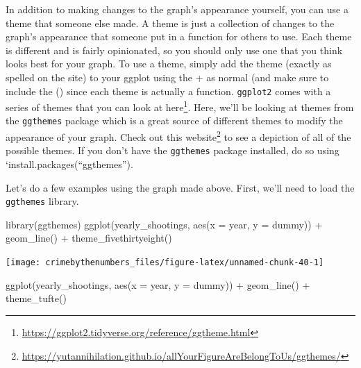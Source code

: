 \documentclass[
]{krantz}
\makeatletter
\newenvironment{Shaded}{\begin{snugshade}}{\end{snugshade}}
\newcommand{\AttributeTok}[1]{\textcolor[rgb]{0.61,0.61,0.61}{#1}}
\newcommand{\FunctionTok}[1]{\textcolor[rgb]{0,0,0}{#1}}
\newcommand{\NormalTok}[1]{#1}
\newcommand{\SpecialCharTok}[1]{\textcolor[rgb]{0,0,0}{#1}}
\renewcommand{\href}[2]{#2\footnote{\url{#1}}}
\newenvironment{kframe}{%
\medskip{}
\setlength{\fboxsep}{.8em}
 \def\at@end@of@kframe{}%
 \ifinner\ifhmode%
  \def\at@end@of@kframe{\end{minipage}}%
  \begin{minipage}{\columnwidth}%
 \fi\fi%
 \def\FrameCommand##1{\hskip\@totalleftmargin \hskip-\fboxsep
 \colorbox{shadecolor}{##1}\hskip-\fboxsep
     \hskip-\linewidth \hskip-\@totalleftmargin \hskip\columnwidth}%
 \MakeFramed {\advance\hsize-\width
   \@totalleftmargin\z@ \linewidth\hsize
   \@setminipage}}%
 {\par\unskip\endMakeFramed%
 \at@end@of@kframe}
\renewenvironment{Shaded}{\begin{kframe}}{\end{kframe}}
\makeatother
\begin{document}
In addition to making changes to the graph's appearance yourself, you can use a theme that someone else made. A theme is just a collection of changes to the graph's appearance that someone put in a function for others to use. Each theme is different and is fairly opinionated, so you should only use one that you think looks best for your graph. To use a theme, simply add the theme (exactly as spelled on the site) to your ggplot using the + as normal (and make sure to include the () since each theme is actually a function. \texttt{ggplot2} comes with a series of themes that you can look at \href{https://ggplot2.tidyverse.org/reference/ggtheme.html}{here}. Here, we'll be looking at themes from the \texttt{ggthemes} package which is a great source of different themes to modify the appearance of your graph. Check out this \href{https://yutannihilation.github.io/allYourFigureAreBelongToUs/ggthemes/}{website} to see a depiction of all of the possible themes. If you don't have the \texttt{ggthemes} package installed, do so using `install.packages(``ggthemes'').

Let's do a few examples using the graph made above. First, we'll need to load the \texttt{ggthemes} library.

\begin{Shaded}
\begin{Highlighting}[]
\FunctionTok{library}\NormalTok{(ggthemes)}
\FunctionTok{ggplot}\NormalTok{(yearly\_shootings, }\FunctionTok{aes}\NormalTok{(}\AttributeTok{x =}\NormalTok{ year, }\AttributeTok{y =}\NormalTok{ dummy)) }\SpecialCharTok{+}
  \FunctionTok{geom\_line}\NormalTok{() }\SpecialCharTok{+}
  \FunctionTok{theme\_fivethirtyeight}\NormalTok{()}
\end{Highlighting}
\end{Shaded}

\begin{center}\texttt{[image: crimebythenumbers\_files/figure-latex/unnamed-chunk-40-1]} \end{center}

\begin{Shaded}
\begin{Highlighting}[]
\FunctionTok{ggplot}\NormalTok{(yearly\_shootings, }\FunctionTok{aes}\NormalTok{(}\AttributeTok{x =}\NormalTok{ year, }\AttributeTok{y =}\NormalTok{ dummy)) }\SpecialCharTok{+}
  \FunctionTok{geom\_line}\NormalTok{() }\SpecialCharTok{+}
  \FunctionTok{theme\_tufte}\NormalTok{()}
\end{Highlighting}
\end{Shaded}
\end{document}
